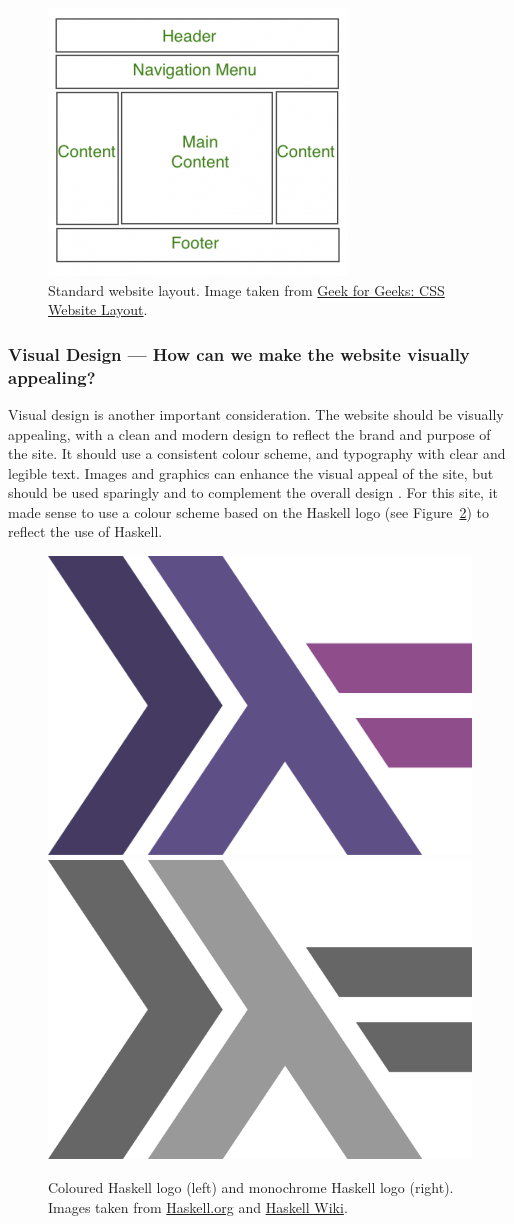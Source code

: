 \documentclass[../main.tex]{subfiles}
\begin{document}
                \begin{figure}[H]
                    \centering
                    \includegraphics[width=0.35\linewidth]{images/webLayout.png}
                        \caption{Standard website layout.
                            Image taken from \href{https://www.geeksforgeeks.org/css-website-layout/}{Geek
                                    for Geeks: CSS Website Layout}.
                        }
                        \label{fig:webLayout}
                \end{figure}

            \subsubsection{Visual Design — How can we make the website visually appealing?}
                Visual design is another important consideration.
                The website should be visually appealing, with a clean and modern design to
                    reflect the brand and purpose of the site.
                It should use a consistent colour scheme, and typography with clear and legible
                    text.
                Images and graphics can enhance the visual appeal of the site, but should be
                    used sparingly and to complement the overall design \citep{images}.
                For this site, it made sense to use a colour scheme based on the Haskell logo
                    (see Figure~\ref{fig:haskell}) to reflect the use of Haskell.

                \begin{figure}[H]
                    \centering
                    \includegraphics[width=0.2\linewidth]{images/haskell.png}
                    \includegraphics[width=0.2\linewidth]{images/haskellGrey.png}
                        \caption{Coloured Haskell logo (left) and monochrome Haskell logo (right).
                            Images taken from \href{https://www.haskell.org/}{Haskell.org} and
                                \href{https://wiki.haskell.org/Haskell_logos}{Haskell Wiki}.
                        }
                        \label{fig:haskell}
                \end{figure}
\end{document}

